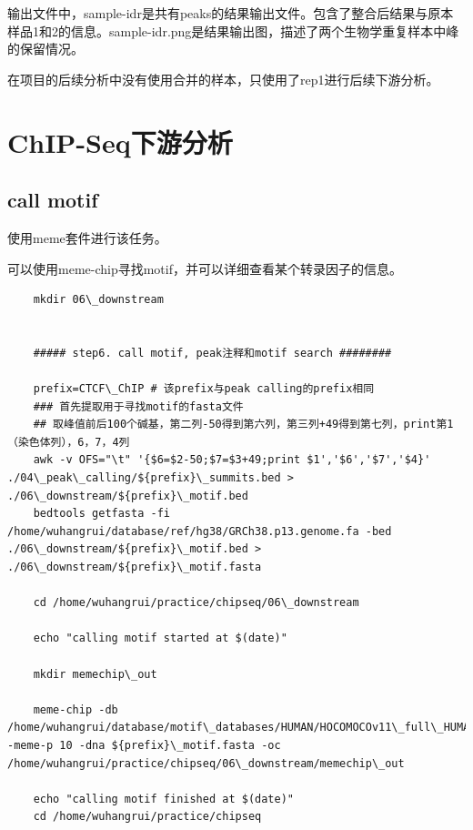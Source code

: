 输出文件中，sample-idr是共有peaks的结果输出文件。包含了整合后结果与原本样品1和2的信息。sample-idr.png是结果输出图，描述了两个生物学重复样本中峰的保留情况。\par
在项目的后续分析中没有使用合并的样本，只使用了rep1进行后续下游分析。

\section{ChIP-Seq下游分析}
\subsection{call motif}
使用meme套件进行该任务。\par
可以使用meme-chip寻找motif，并可以详细查看某个转录因子的信息。

\begin{lstlisting}
    mkdir 06\_downstream


    ##### step6. call motif, peak注释和motif search ########

    prefix=CTCF\_ChIP # 该prefix与peak calling的prefix相同
    ### 首先提取用于寻找motif的fasta文件
    ## 取峰值前后100个碱基，第二列-50得到第六列，第三列+49得到第七列，print第1（染色体列），6，7，4列
    awk -v OFS="\t" '{$6=$2-50;$7=$3+49;print $1','$6','$7','$4}' ./04\_peak\_calling/${prefix}\_summits.bed > ./06\_downstream/${prefix}\_motif.bed
    bedtools getfasta -fi /home/wuhangrui/database/ref/hg38/GRCh38.p13.genome.fa -bed ./06\_downstream/${prefix}\_motif.bed > ./06\_downstream/${prefix}\_motif.fasta

    cd /home/wuhangrui/practice/chipseq/06\_downstream

    echo "calling motif started at $(date)"

    mkdir memechip\_out

    meme-chip -db /home/wuhangrui/database/motif\_databases/HUMAN/HOCOMOCOv11\_full\_HUMAN\_mono\_meme\_format.meme -meme-p 10 -dna ${prefix}\_motif.fasta -oc /home/wuhangrui/practice/chipseq/06\_downstream/memechip\_out

    echo "calling motif finished at $(date)"
    cd /home/wuhangrui/practice/chipseq
\end{lstlisting}

